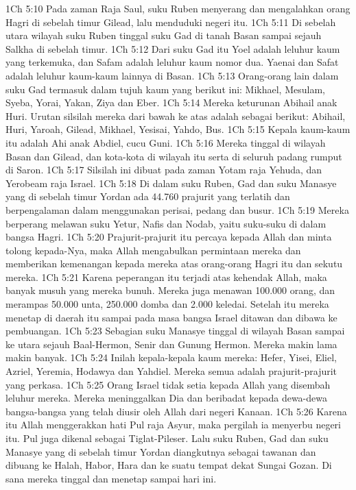 1Ch 5:10  Pada zaman Raja Saul, suku Ruben menyerang dan mengalahkan orang Hagri di sebelah timur Gilead, lalu menduduki negeri itu.
1Ch 5:11  Di sebelah utara wilayah suku Ruben tinggal suku Gad di tanah Basan sampai sejauh Salkha di sebelah timur.
1Ch 5:12  Dari suku Gad itu Yoel adalah leluhur kaum yang terkemuka, dan Safam adalah leluhur kaum nomor dua. Yaenai dan Safat adalah leluhur kaum-kaum lainnya di Basan.
1Ch 5:13  Orang-orang lain dalam suku Gad termasuk dalam tujuh kaum yang berikut ini: Mikhael, Mesulam, Syeba, Yorai, Yakan, Ziya dan Eber.
1Ch 5:14  Mereka keturunan Abihail anak Huri. Urutan silsilah mereka dari bawah ke atas adalah sebagai berikut: Abihail, Huri, Yaroah, Gilead, Mikhael, Yesisai, Yahdo, Bus.
1Ch 5:15  Kepala kaum-kaum itu adalah Ahi anak Abdiel, cucu Guni.
1Ch 5:16  Mereka tinggal di wilayah Basan dan Gilead, dan kota-kota di wilayah itu serta di seluruh padang rumput di Saron.
1Ch 5:17  Silsilah ini dibuat pada zaman Yotam raja Yehuda, dan Yerobeam raja Israel.
1Ch 5:18  Di dalam suku Ruben, Gad dan suku Manasye yang di sebelah timur Yordan ada 44.760 prajurit yang terlatih dan berpengalaman dalam menggunakan perisai, pedang dan busur.
1Ch 5:19  Mereka berperang melawan suku Yetur, Nafis dan Nodab, yaitu suku-suku di dalam bangsa Hagri.
1Ch 5:20  Prajurit-prajurit itu percaya kepada Allah dan minta tolong kepada-Nya, maka Allah mengabulkan permintaan mereka dan memberikan kemenangan kepada mereka atas orang-orang Hagri itu dan sekutu mereka.
1Ch 5:21  Karena peperangan itu terjadi atas kehendak Allah, maka banyak musuh yang mereka bunuh. Mereka juga menawan 100.000 orang, dan merampas 50.000 unta, 250.000 domba dan 2.000 keledai. Setelah itu mereka menetap di daerah itu sampai pada masa bangsa Israel ditawan dan dibawa ke pembuangan.
1Ch 5:23  Sebagian suku Manasye tinggal di wilayah Basan sampai ke utara sejauh Baal-Hermon, Senir dan Gunung Hermon. Mereka makin lama makin banyak.
1Ch 5:24  Inilah kepala-kepala kaum mereka: Hefer, Yisei, Eliel, Azriel, Yeremia, Hodawya dan Yahdiel. Mereka semua adalah prajurit-prajurit yang perkasa.
1Ch 5:25  Orang Israel tidak setia kepada Allah yang disembah leluhur mereka. Mereka meninggalkan Dia dan beribadat kepada dewa-dewa bangsa-bangsa yang telah diusir oleh Allah dari negeri Kanaan.
1Ch 5:26  Karena itu Allah menggerakkan hati Pul raja Asyur, maka pergilah ia menyerbu negeri itu. Pul juga dikenal sebagai Tiglat-Pileser. Lalu suku Ruben, Gad dan suku Manasye yang di sebelah timur Yordan diangkutnya sebagai tawanan dan dibuang ke Halah, Habor, Hara dan ke suatu tempat dekat Sungai Gozan. Di sana mereka tinggal dan menetap sampai hari ini.
